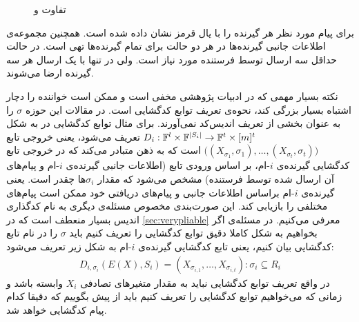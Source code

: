 \begin{remark}
\begin{figure}
\begin{subfigure}[b]{0.45\textwidth}
    		\caption{\icod}
    	\end{subfigure}
    	\caption[تفاوت
    	\icod
    	و
    	\picod
    	]{
    		تفاوت
    		\icod
    		و
    		\picod
    	}
    	\label{fig:pliablefragouli1}
    \end{figure}
    برای
    \icod
    پیام مورد نظر هر گیرنده را با یال قرمز نشان داده شده است. همچنین مجموعه‌ی اطلاعات جانبی گیرنده‌ها در هر دو حالت برای تمام گیرنده‌ها تهی است. در حالت
    \icod
    حداقل سه ارسال توسط فرستنده مورد نیاز است. ولی در
    \picod
    تنها با یک ارسال هر سه گیرنده ارضا می‌شوند.
\end{remark}
\begin{remark}
    \label{remark:pliablevsvery}
    نکته بسیار مهمی که در ادبیات پژوهشی
    \picod
    مخفی است و ممکن است خواننده را دچار اشتباه بسیار بزرگی کند، نحوه‌ی تعریف توابع کدگشایی است. در مقالات این حوزه
    $\sigma$
    را به عنوان بخشی از تعریف اندیس‌کد نمی‌آورند. برای مثال توابع کدگشایی در
    \cite{song2017polynomialtime}
    به شکل
    $D_i: \mathbb{F}^l \times \mathbb{F}^{\left|{S_i}\right|} \rightarrow \mathbb{F}^t \times [m]^t$
    تعریف می‌شود، یعنی خروجی تابع
    $\big((X_{\sigma_1}, \sigma_1), \ldots, (X_{\sigma_t}, \sigma_t) \big)$
    است که به ذهن متبادر می‌کند که در خروجی تابع کدگشایی گیرنده‌ی
    $i$-ام، بر اساس ورودی تابع (اطلاعات جانبی گیرنده‌ی
    $i$-ام و پیام‌های آن ارسال شده توسط فرستنده) مشخص می‌شود که مقدار
    $\sigma_i$ها چقدر است. یعنی گیرنده‌ی
    $i$-ام براساس اطلاعات جانبی و پیام‌های دریافتی خود ممکن است پیام‌های مختلفی را بازیابی کند. این صورت‌بندی مخصوص مسئله‌ی دیگری به نام کدگذاری اندیس بسیار منعطف است که در
    \autoref{sec:verypliable}
    معرفی می‌کنیم. در مسئله‌ی
    \picod
    اگر بخواهیم به شکل کاملا دقیق توابع کدگشایی را تعریف کنیم باید
    $\sigma$
    را در نام تابع کدگشایی بیان کنیم، یعنی تابع کدگشایی گیرنده‌ی
    $i$-ام به شکل زیر تعریف می‌شود:
    \begin{align}
        D_{i, \sigma_i}(E(X), S_i) = (X_{\sigma_{i,1}}, \ldots, X_{\sigma_{i,t}}): \sigma_i \subseteq R_i
    \end{align}
    در واقع تعریف توابع کدگشایی نباید به مقدار متغیرهای تصادفی
    $X_i$
    وابسته باشد و زمانی که می‌خواهیم توابع کدگشایی را تعریف کنیم باید از پیش بگوییم که دقیقا کدام پیام کدگشایی خواهد شد.
\end{remark}

